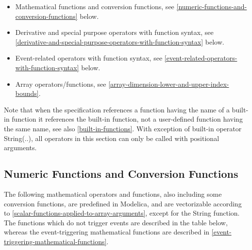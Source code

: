 \begin{itemize}
\item
  Mathematical functions and conversion functions, see \autoref{numeric-functions-and-conversion-functions}
  below.
\item
  Derivative and special purpose operators with function syntax, see
  \autoref{derivative-and-special-purpose-operators-with-function-syntax} below.
\item
  Event-related operators with function syntax, see \autoref{event-related-operators-with-function-syntax} below.
\item
  Array operators/functions, see \autoref{array-dimension-lower-and-upper-index-bounds}.
\end{itemize}

Note that when the specification references a function having the name
of a built-in function it references the built-in function, not a
user-defined function having the same name, see also \autoref{built-in-functions}. With
exception of built-in operator String(..), all operators in this section
can only be called with positional arguments.

\subsection{Numeric Functions and Conversion Functions}

The following mathematical operators and functions, also including some
conversion functions, are predefined in Modelica, and are vectorizable
according to \autoref{scalar-functions-applied-to-array-arguments}, except for the String function. The
functions which do not trigger events are described in the table below,
whereas the event-triggering mathematical functions are described in
\autoref{event-triggering-mathematical-functions}.

